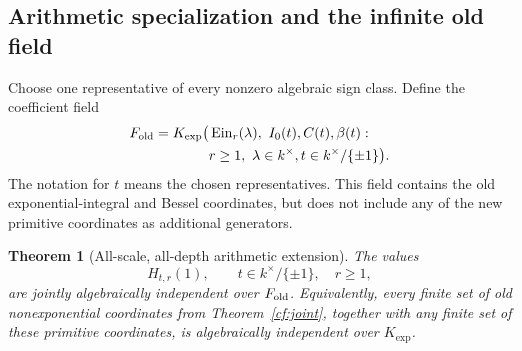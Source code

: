 \documentclass[11pt]{article}
\newtheorem{theorem}{Theorem}[section]
\theoremstyle{definition}
\theoremstyle{remark}
\newcommand{\Ein}{\operatorname{Ein}}
\newcommand{\Kexp}{K_{\mathrm{exp}}}
\begin{document}
\subsection{Arithmetic specialization and the infinite old field}

Choose one representative of every nonzero algebraic sign class.
Define the coefficient field
\begin{equation}\label{depth:old-field}
\begin{split}
 F_{\rm old}=\Kexp\bigl(&\Ein_r(\lambda),\ I_0(t),C(t),\beta(t):\\
             &r\ge1,\ \lambda\in k^\times,
             t\in k^\times/\{\pm1\}\bigr).
\end{split}
\end{equation}
The notation for $t$ means the chosen representatives.
This field contains the old exponential-integral and Bessel
coordinates, but does not include any of the new primitive
coordinates as additional generators.

\begin{theorem}[All-scale, all-depth arithmetic extension]
\label{depth:values}
The values
\[
                 H_{t,r}(1),\qquad
 t\in k^\times/\{\pm1\},\quad r\ge1,
\]
are jointly algebraically independent over $F_{\rm old}$.
Equivalently, every finite set of old nonexponential coordinates
from Theorem~\ref{cf:joint}, together with any finite set of these
primitive coordinates, is algebraically independent over $\Kexp$.
\end{theorem}
\end{document}
